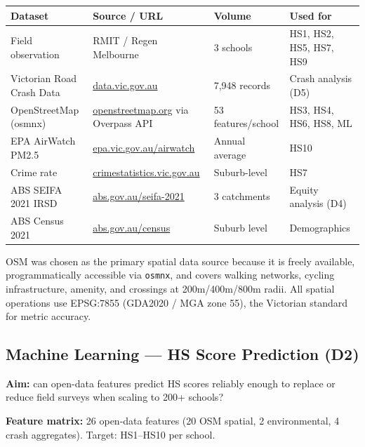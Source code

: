 \documentclass[11pt,a4paper]{article}
\begin{document}
\begin{table}[H]\centering\small
\begin{tabular}{L{3.2cm}L{4.2cm}L{1.8cm}L{4.3cm}}
\toprule
\textbf{Dataset} & \textbf{Source / URL} & \textbf{Volume} & \textbf{Used for} \\
\midrule
Field observation & RMIT / Regen Melbourne & 3 schools & HS1, HS2, HS5, HS7, HS9 \\
Victorian Road Crash Data & \href{https://www.data.vic.gov.au}{data.vic.gov.au} & 7,948 records & Crash analysis (D5) \\
OpenStreetMap (osmnx) & \href{https://www.openstreetmap.org}{openstreetmap.org} via Overpass API & 53 features/school & HS3, HS4, HS6, HS8, ML \\
EPA AirWatch PM2.5 & \href{https://www.epa.vic.gov.au/for-community/monitoring-the-environment/airwatch}{epa.vic.gov.au/airwatch} & Annual average & HS10 \\
Crime rate & \href{https://www.crimestatistics.vic.gov.au}{crimestatistics.vic.gov.au} & Suburb-level & HS7 \\
ABS SEIFA 2021 IRSD & \href{https://www.abs.gov.au/statistics/people/people-and-communities/socio-economic-indexes-areas-seifa-australia/2021}{abs.gov.au/seifa-2021} & 3 catchments & Equity analysis (D4) \\
ABS Census 2021 & \href{https://www.abs.gov.au/census}{abs.gov.au/census} & Suburb level & Demographics \\
\bottomrule
\end{tabular}
\end{table}

OSM was chosen as the primary spatial data source because it is freely available, programmatically accessible via \texttt{osmnx}, and covers walking networks, cycling infrastructure, amenity, and crossings at 200m/400m/800m radii. All spatial operations use EPSG:7855 (GDA2020 / MGA zone 55), the Victorian standard for metric accuracy.

\subsection{Machine Learning — HS Score Prediction (D2)}

\textbf{Aim:} can open-data features predict HS scores reliably enough to replace or reduce field surveys when scaling to 200+ schools?

\textbf{Feature matrix:} 26 open-data features (20 OSM spatial, 2 environmental, 4 crash aggregates). Target: HS1--HS10 per school.
\end{document}
